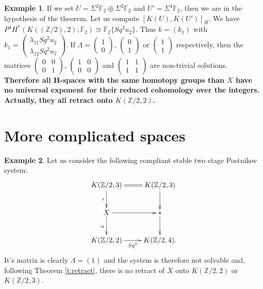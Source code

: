 \documentclass[11pt,a4paper]{amsart}
\theoremstyle{plain}
\theoremstyle{definition}
\newtheorem{exmp}{Example}[section]
\theoremstyle{remark}
\newcommand{\Z}{\mathbb{Z}}
\newcommand{\F}{\mathbb{F}}
\begin{document}
\begin{exmp}
If we set $U=\Sigma^2\F_2\oplus\Sigma^2\F_2$ and $U'=\Sigma^4\F_2$, then we are in the hypothesis of the theorem. Let us compute $[K(U),K(U')]_H$. We have $P^{4}H^*(K((\Z/2),2);\F_2)\cong\F_2\{Sq^2u_2\}$. Thus $k=(k_1)$ with $k_1=\begin{pmatrix}\lambda_{11}Sq^2u_2\\ \lambda_{12}Sq^2u_2\end{pmatrix}$.
If $\Lambda=\begin{pmatrix}1\\ 0\end{pmatrix}$, $\begin{pmatrix}0\\ 1\end{pmatrix}$ or $\begin{pmatrix}1\\ 1\end{pmatrix}$ respectively, then the matrices $\begin{pmatrix}0 &0\\ 0 &1\end{pmatrix}$, $\begin{pmatrix}1 &0\\ 0 &0\end{pmatrix}$ and $\begin{pmatrix}1 &1\\ 1 &1\end{pmatrix}$ are non-trivial solutions. {\bf Therefore all H-spaces with the same homotopy groups than $X$ have no universal exponent for their reduced cohomology over the integers. Actually, they all retract onto $K(\Z/2,2)$.}
\end{exmp}

\section{More complicated spaces}
\label{s:more}

\begin{exmp}\label{e:fundamental}
Let us consider the following compliant stable two stage Postnikov system:
$$\xymatrix{
K(\Z/2,3)\ar[d]_\iota\ar@{=}[r] &K(\Z/2,3)\ar[d]\\
X\ar[r]\ar[d]_\alpha &{*}\ar[d]\\
K(\Z/2,2)\ar[r]_-{Sq^2} &K(\Z/2,4).
}$$ It's matrix is clearly $\Lambda=(1)$ and the system is therefore not solvable and, following Theorem \ref{t:retract}, there is no retract of $X$ onto $K(\Z/2,2)$ or $K(\Z/2,3)$.
\end{exmp}
\end{document}
